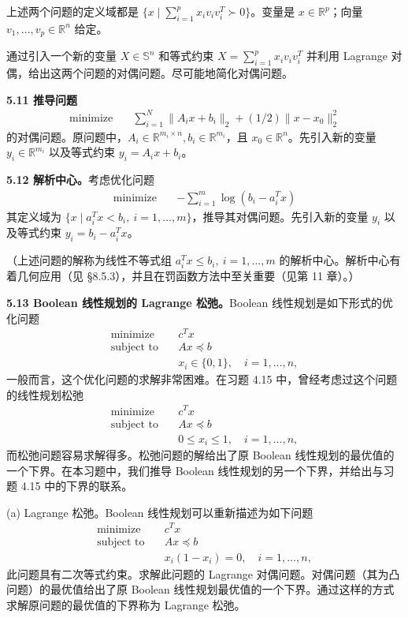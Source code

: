 \documentclass[UTF8,12pt,a4paper,fontset=fandol]{ctexart}
\begin{document}
上述两个问题的定义域都是 $\{x\mid \sum_{i=1}^p x_iv_iv_i^T\succ 0\}$。变量是 $x\in\mathbb{R}^p$；向量 $v_1,\ldots,v_p\in\mathbb{R}^n$ 给定。

通过引入一个新的变量 $X\in\mathbb{S}^n$ 和等式约束 $X=\sum_{i=1}^p x_iv_iv_i^T$ 并利用 Lagrange 对偶，给出这两个问题的对偶问题。尽可能地简化对偶问题。

\noindent\textbf{5.11 推导问题}
\[
\begin{aligned}
\text{minimize}\quad & \sum_{i=1}^N\|A_ix+b_i\|_2+(1/2)\|x-x_0\|_2^2
\end{aligned}
\]
的对偶问题。原问题中，$A_i\in\mathbb{R}^{m_i\times n}, b_i\in\mathbb{R}^{m_i}$，且 $x_0\in\mathbb{R}^n$。先引入新的变量 $y_i\in\mathbb{R}^{m_i}$ 以及等式约束 $y_i=A_ix+b_i$。

\noindent\textbf{5.12 解析中心。}\quad 考虑优化问题
\[
\begin{aligned}
\text{minimize}\quad & -\sum_{i=1}^m\log(b_i-a_i^Tx)
\end{aligned}
\]
其定义域为 $\{x\mid a_i^Tx<b_i,\ i=1,\ldots,m\}$，推导其对偶问题。先引入新的变量 $y_i$ 以及等式约束 $y_i=b_i-a_i^Tx$。

（上述问题的解称为线性不等式组 $a_i^Tx\leq b_i,\ i=1,\ldots,m$ 的解析中心。解析中心有着几何应用（见 §8.5.3），并且在罚函数方法中至关重要（见第 11 章）。）

\noindent\textbf{5.13 Boolean 线性规划的 Lagrange 松弛。}\quad Boolean 线性规划是如下形式的优化问题
\[
\begin{aligned}
\text{minimize}\quad & c^Tx\\
\text{subject to}\quad & Ax\preceq b\\
& x_i\in\{0,1\},\quad i=1,\ldots,n,
\end{aligned}
\]
一般而言，这个优化问题的求解非常困难。在习题 4.15 中，曾经考虑过这个问题的线性规划松弛
\begin{equation}
\begin{aligned}
\text{minimize}\quad & c^Tx\\
\text{subject to}\quad & Ax\preceq b\\
& 0\leq x_i\leq 1,\quad i=1,\ldots,n,
\end{aligned}
\tag{5.107}
\end{equation}
而松弛问题容易求解得多。松弛问题的解给出了原 Boolean 线性规划的最优值的一个下界。在本习题中，我们推导 Boolean 线性规划的另一个下界，并给出与习题 4.15 中的下界的联系。

(a) Lagrange 松弛。Boolean 线性规划可以重新描述为如下问题
\[
\begin{aligned}
\text{minimize}\quad & c^Tx\\
\text{subject to}\quad & Ax\preceq b\\
& x_i(1-x_i)=0,\quad i=1,\ldots,n,
\end{aligned}
\]
此问题具有二次等式约束。求解此问题的 Lagrange 对偶问题。对偶问题（其为凸问题）的最优值给出了原 Boolean 线性规划最优值的一个下界。通过这样的方式求解原问题的最优值的下界称为 Lagrange 松弛。
\end{document}
